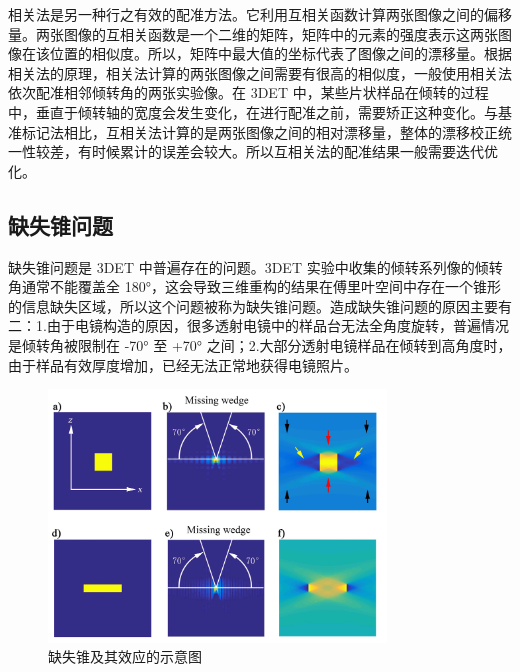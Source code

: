 相关法是另一种行之有效的配准方法。它利用互相关函数计算两张图像之间的偏移量。两张图像的互相关函数是一个二维的矩阵，矩阵中的元素的强度表示这两张图像在该位置的相似度。所以，矩阵中最大值的坐标代表了图像之间的漂移量。根据相关法的原理，相关法计算的两张图像之间需要有很高的相似度，一般使用相关法依次配准相邻倾转角的两张实验像。在 3DET 中，某些片状样品在倾转的过程中，垂直于倾转轴的宽度会发生变化，在进行配准之前，需要矫正这种变化。与基准标记法相比，互相关法计算的是两张图像之间的相对漂移量，整体的漂移校正统一性较差，有时候累计的误差会较大。所以互相关法的配准结果一般需要迭代优化。
\subsection{缺失锥问题}
缺失锥问题是 3DET 中普遍存在的问题。3DET 实验中收集的倾转系列像的倾转角通常不能覆盖全 180°，这会导致三维重构的结果在傅里叶空间中存在一个锥形的信息缺失区域，所以这个问题被称为缺失锥问题。造成缺失锥问题的原因主要有二：1.由于电镜构造的原因，很多透射电镜中的样品台无法全角度旋转，普遍情况是倾转角被限制在 -70° 至 +70° 之间；2.大部分透射电镜样品在倾转到高角度时，由于样品有效厚度增加，已经无法正常地获得电镜照片。

\begin{figure}[htbp]
	\vspace{\baselineskip}
	\centering
	\includegraphics[width=0.8\textwidth]{../1.10/110}
	\caption{缺失锥及其效应的示意图}\label{fig:110}
	\song{}
\end{figure}

